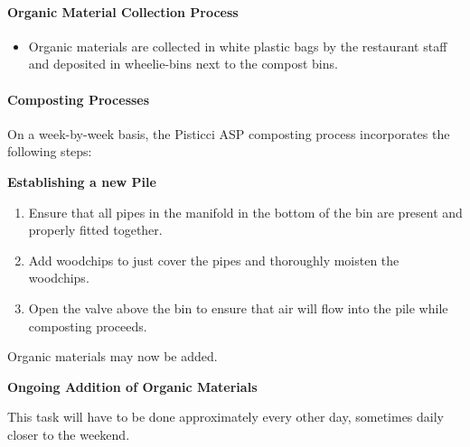 \paragraph{Organic Material Collection
Process}\label{organic-material-collection-process}

\begin{itemize}
\itemsep1pt\parskip0pt
\item
  Organic materials are collected in white plastic bags by the
  restaurant staff and deposited in wheelie-bins next to the compost
  bins.
\end{itemize}

\paragraph{Composting Processes}\label{composting-processes}

On a week-by-week basis, the Pisticci ASP composting process
incorporates the following steps:

\textbf{Establishing a new Pile}

\begin{enumerate}
\def\labelenumi{\arabic{enumi}.}
\itemsep1pt\parskip0pt
\item
  Ensure that all pipes in the manifold in the bottom of the bin are
  present and properly fitted together.
\item
  Add woodchips to just cover the pipes and thoroughly moisten the
  woodchips.
\item
  Open the valve above the bin to ensure that air will flow into the
  pile while composting proceeds.
\end{enumerate}

Organic materials may now be added.

\textbf{Ongoing Addition of Organic Materials}

This task will have to be done approximately every other day, sometimes
daily closer to the weekend.

